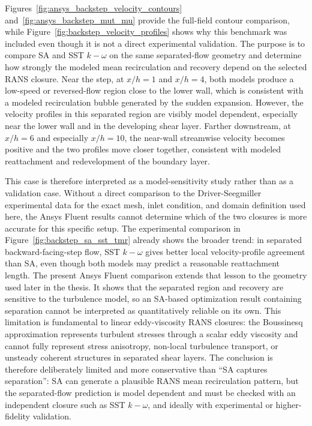 Figures~\ref{fig:ansys_backstep_velocity_contours} and~\ref{fig:ansys_backstep_mut_mu} provide the full-field contour comparison, while Figure~\ref{fig:backstep_velocity_profiles} shows why this benchmark was included even though it is not a direct experimental validation. The purpose is to compare SA and SST $k-\omega$ on the same separated-flow geometry and determine how strongly the modeled mean recirculation and recovery depend on the selected RANS closure. Near the step, at $x/h=1$ and $x/h=4$, both models produce a low-speed or reversed-flow region close to the lower wall, which is consistent with a modeled recirculation bubble generated by the sudden expansion. However, the velocity profiles in this separated region are visibly model dependent, especially near the lower wall and in the developing shear layer. Farther downstream, at $x/h=6$ and especially $x/h=10$, the near-wall streamwise velocity becomes positive and the two profiles move closer together, consistent with modeled reattachment and redevelopment of the boundary layer.

This case is therefore interpreted as a model-sensitivity study rather than as a validation case. Without a direct comparison to the Driver-Seegmiller experimental data for the exact mesh, inlet condition, and domain definition used here, the Ansys Fluent results cannot determine which of the two closures is more accurate for this specific setup. The experimental comparison in Figure~\ref{fig:backstep_sa_sst_tmr} already shows the broader trend: in separated backward-facing-step flow, SST $k-\omega$ gives better local velocity-profile agreement than SA, even though both models may predict a reasonable reattachment length. The present Ansys Fluent comparison extends that lesson to the geometry used later in the thesis. It shows that the separated region and recovery are sensitive to the turbulence model, so an SA-based optimization result containing separation cannot be interpreted as quantitatively reliable on its own. This limitation is fundamental to linear eddy-viscosity RANS closures: the Boussinesq approximation represents turbulent stresses through a scalar eddy viscosity and cannot fully represent stress anisotropy, non-local turbulence transport, or unsteady coherent structures in separated shear layers. The conclusion is therefore deliberately limited and more conservative than ``SA captures separation'': SA can generate a plausible RANS mean recirculation pattern, but the separated-flow prediction is model dependent and must be checked with an independent closure such as SST $k-\omega$, and ideally with experimental or higher-fidelity validation.

\FloatBarrier
